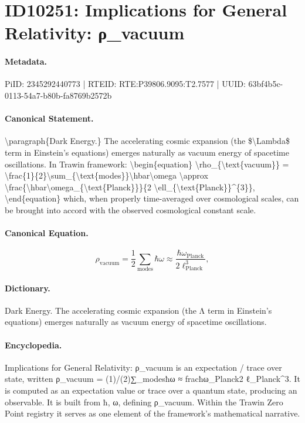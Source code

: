 \section*{ID10251: Implications for General Relativity: ρ\_vacuum}
\paragraph{Metadata.}
PiID: 2345292440773 | RTEID: RTE:P39806.9095:T2.7577 | UUID: 63bf4b5c-0113-54a7-b80b-fa8769b2572b

\paragraph{Canonical Statement.}
\textbackslash{}paragraph\{Dark Energy.\} The accelerating cosmic expansion (the \$\textbackslash{}Lambda\$ term in Einstein's equations) emerges naturally as vacuum energy of spacetime oscillations. In Trawin framework: \textbackslash{}begin\{equation\} \textbackslash{}rho\_\{\textbackslash{}text\{vacuum\}\} = \textbackslash{}frac\{1\}\{2\}\textbackslash{}sum\_\{\textbackslash{}text\{modes\}\}\textbackslash{}hbar\textbackslash{}omega \textbackslash{}approx \textbackslash{}frac\{\textbackslash{}hbar\textbackslash{}omega\_\{\textbackslash{}text\{Planck\}\}\}\{2 \textbackslash{}ell\_\{\textbackslash{}text\{Planck\}\}\textasciicircum{}\{3\}\}, \textbackslash{}end\{equation\} which, when properly time-averaged over cosmological scales, can be brought into accord with the observed cosmological constant scale.

\paragraph{Canonical Equation.}
\[
\rho_{\text{vacuum}} = \frac{1}{2}\sum_{\text{modes}}\hbar\omega \approx \frac{\hbar\omega_{\text{Planck}}}{2 \ell_{\text{Planck}}^{3}},
\]

\paragraph{Dictionary.}
Dark Energy. The accelerating cosmic expansion (the Λ term in Einstein's equations) emerges naturally as vacuum energy of spacetime oscillations.

\paragraph{Encyclopedia.}
Implications for General Relativity: ρ\_vacuum is an expectation / trace over state, written ρ\_vacuum = (1)/(2)∑\_modesħω ≈ fracħω\_Planck2 ℓ\_Planck\textasciicircum{}3. It is computed as an expectation value or trace over a quantum state, producing an observable. It is built from ħ, ω, defining ρ\_vacuum. Within the Trawin Zero Point registry it serves as one element of the framework's mathematical narrative.
